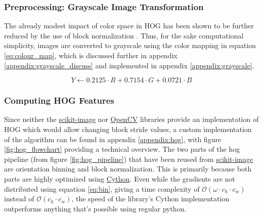 \subsubsection{Preprocessing: Grayscale Image Transformation}

The already modest impact of color space in HOG has been shown to be further reduced by the use of block normalization \cite{dalal_2005_histograms}. Thus, for the sake computational simplicity, images are converted to grayscale \cite{madk_2008_perceptual} using the color mapping in equation \ref{eq:colour_map}, which is discussed further in appendix \ref{appendix:grayscale_discuss} and implemented in appendix \ref{appendix:grayscale}.

\begin{equation}\label{eq:colour_map}
    Y \leftarrow 0.2125 \cdot R + 0.7154 \cdot G + 0.0721 \cdot B
\end{equation}

\subsubsection{Computing HOG Features}

Since neither the \href{https://scikit-image.org/}{scikit-image} nor \href{https://opencv.org/}{OpenCV} libraries provide an implementation of HOG which would allow changing block stride values, a custom implementation of the algorithm can be found in appendix \ref{appendix:hog}, with figure \ref{fig:hog_flowchart} providing a technical overview. The two parts of the hog pipeline (from figure \ref{fig:hog_pipeline}) that have been reused from \href{https://scikit-image.org/}{scikit-image} are orientation binning and block normalization. This is primarily because both parts are highly optimized using \href{https://cython.org/}{Cython}. Even while the gradients are not distributed using equation \ref{eq:bin}, giving a time complexity of $\mathcal{O}(\omega \cdot c_h \cdot c_w)$ instead of $\mathcal{O}(c_h \cdot c_w)$, the speed of the library's Cython implementation outperforms anything that's possible using regular python.

